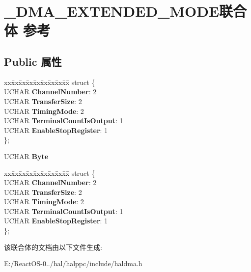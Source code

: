 \hypertarget{union___d_m_a___e_x_t_e_n_d_e_d___m_o_d_e}{}\section{\+\_\+\+D\+M\+A\+\_\+\+E\+X\+T\+E\+N\+D\+E\+D\+\_\+\+M\+O\+D\+E联合体 参考}
\label{union___d_m_a___e_x_t_e_n_d_e_d___m_o_d_e}
\subsection*{Public 属性}
\begin{DoxyCompactItemize}
\item 
\mbox{\label{union___d_m_a___e_x_t_e_n_d_e_d___m_o_d_e_a37c393f6f82e462a150d6dc78f363b4b}} 
\begin{tabbing}
xx\=xx\=xx\=xx\=xx\=xx\=xx\=xx\=xx\=\kill
struct \{\\
\>UCHAR {\bfseries ChannelNumber}: 2\\
\>UCHAR {\bfseries TransferSize}: 2\\
\>UCHAR {\bfseries TimingMode}: 2\\
\>UCHAR {\bfseries TerminalCountIsOutput}: 1\\
\>UCHAR {\bfseries EnableStopRegister}: 1\\
\}; \\

\end{tabbing}\item 
\mbox{\label{union___d_m_a___e_x_t_e_n_d_e_d___m_o_d_e_ab648c7d2a912d25e6f810e85f15d95ff}} 
U\+C\+H\+AR {\bfseries Byte}
\item 
\mbox{\label{union___d_m_a___e_x_t_e_n_d_e_d___m_o_d_e_ae993d2eaf9b93e08d89a21e3c5b160c3}} 
\begin{tabbing}
xx\=xx\=xx\=xx\=xx\=xx\=xx\=xx\=xx\=\kill
struct \{\\
\>UCHAR {\bfseries ChannelNumber}: 2\\
\>UCHAR {\bfseries TransferSize}: 2\\
\>UCHAR {\bfseries TimingMode}: 2\\
\>UCHAR {\bfseries TerminalCountIsOutput}: 1\\
\>UCHAR {\bfseries EnableStopRegister}: 1\\
\}; \\

\end{tabbing}\end{DoxyCompactItemize}


该联合体的文档由以下文件生成\+:\begin{DoxyCompactItemize}
\item 
E\+:/\+React\+O\+S-\/0../hal/halppc/include/haldma.\+h\end{DoxyCompactItemize}
